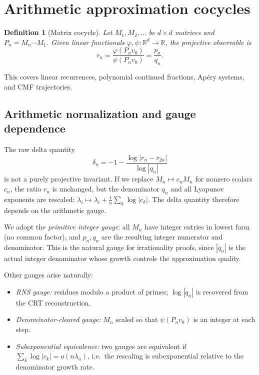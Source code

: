 \documentclass[11pt]{article}
\newtheorem{definition}{Definition}
\begin{document}
\section{Arithmetic approximation cocycles}

\begin{definition}[Matrix cocycle]
Let $M_1, M_2, \ldots$ be $d \times d$ matrices and $P_n = M_n \cdots M_1$. Given linear functionals $\varphi, \psi: \mathbb{R}^d \to \mathbb{R}$, the projective observable is
\[
r_n = \frac{\varphi(P_n v_0)}{\psi(P_n v_0)} = \frac{p_n}{q_n}.
\]
\end{definition}

This covers linear recurrences, polynomial continued fractions, Ap\'ery systems, and CMF trajectories.

\subsection{Arithmetic normalization and gauge dependence}
\label{sec:gauge}

The raw delta quantity
\[
\delta_n = -1 - \frac{\log|r_n - r_{2n}|}{\log|q_n|}
\]
is not a purely projective invariant. If we replace $M_n \mapsto c_n M_n$ for nonzero scalars $c_n$, the ratio $r_n$ is unchanged, but the denominator $q_n$ and all Lyapunov exponents are rescaled: $\lambda_i \mapsto \lambda_i + \frac{1}{n}\sum_k \log|c_k|$. The delta quantity therefore depends on the arithmetic gauge.

We adopt the \emph{primitive integer gauge}: all $M_n$ have integer entries in lowest form (no common factor), and $p_n, q_n$ are the resulting integer numerator and denominator. This is the natural gauge for irrationality proofs, since $|q_n|$ is the actual integer denominator whose growth controls the approximation quality.

Other gauges arise naturally:
\begin{itemize}
\item \emph{RNS gauge:} residues modulo a product of primes; $\log|q_n|$ is recovered from the CRT reconstruction.
\item \emph{Denominator-cleared gauge:} $M_n$ scaled so that $\psi(P_n v_0)$ is an integer at each step.
\item \emph{Subexponential equivalence:} two gauges are equivalent if $\sum_k \log|c_k| = o(n\lambda_a)$, i.e.\ the rescaling is subexponential relative to the denominator growth rate.
\end{itemize}
\end{document}
